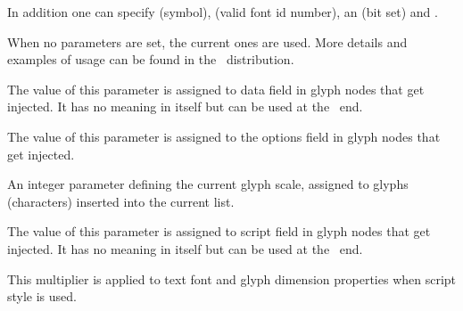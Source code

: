 \startbuffer
{}
\quad
{}
\stopbuffer

\typebuffer

In addition one can specify  (symbol),  (valid font id
number), an  (bit set) and .

\startlinecorrection
\dontleavehmode\getbuffer
\stoplinecorrection

When no parameters are set, the current ones are used. More details and examples
of usage can be found in the \CONTEXT\ distribution.

\stopnewprimitive

\startnewprimitive[title={\prm {glyphdatafield}}]

The value of this parameter is assigned to data field in glyph nodes that get
injected. It has no meaning in itself but can be used at the \LUA\ end.

\stopnewprimitive

\startnewprimitive[title={\prm {glyphoptions}}]

The value of this parameter is assigned to the options field in glyph nodes that
get injected.

\starttworows
{}
\stoptworows

\stopnewprimitive

\startnewprimitive[title={\prm {glyphscale}}]

An integer parameter defining the current glyph scale, assigned to glyphs
(characters) inserted into the current list.

\stopnewprimitive

\startnewprimitive[title={\prm {glyphscriptfield}}]

The value of this parameter is assigned to script field in glyph nodes that get
injected. It has no meaning in itself but can be used at the \LUA\ end.

\stopnewprimitive

\startnewprimitive[title={\prm {glyphscriptscale}}]

This multiplier is applied to text font and glyph dimension properties when script
style is used.

\stopnewprimitive

\startnewprimitive[title={\prm {glyphscriptscriptscale}}]

